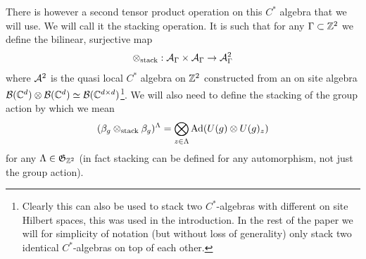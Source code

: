 \documentclass[12pt,a4paper,twoside]{article}
\numberwithin{equation}{section}
\begin{document}
There is however a second tensor product operation on this $C^*$ algebra that we will use. We will call it the stacking operation. It is such that for any $\Gamma\subset\ZZ^2$ we define the bilinear, surjective map
\begin{equation}
	\otimes_{\text{stack}}:\AA_{\Gamma}\times\AA_{\Gamma}\rightarrow \AA^2_{\Gamma}
\end{equation}
where $\AA^2$ is the quasi local $C^*$ algebra on $\ZZ^2$ constructed from an on site algebra $\BB(\CC^d)\otimes\BB(\CC^d)\simeq \BB(\CC^{d\times d})$\footnote{Clearly this can also be used to stack two $C^*$-algebras with different on site Hilbert spaces, this was used in the introduction. In the rest of the paper we will for simplicity of notation (but without loss of generality) only stack two identical $C^*$-algebras on top of each other.}. We will also need to define the stacking of the group action by which we mean
\begin{equation}
	(\beta_g\otimes_{\text{stack}}\beta_g)^\Lambda=\bigotimes_{z\in\Lambda}\Ad{U(g)\otimes U(g)_z}
\end{equation}
for any $\Lambda\in\mathfrak{G}_{\ZZ^2}$ (in fact stacking can be defined for any automorphism, not just the group action).
\end{document}
